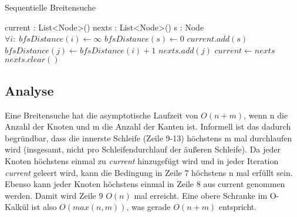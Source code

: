 \begin{algorithm}
	\caption{Sequentielle Breitensuche}
	\label{alg:sequential_bfs}
	\begin{algorithmic}[1]
		\State current : List<Node>()
		\State nexts : List<Node>()
		\State s : Node
		\State  $\forall i: \; bfsDistance(i) \gets \infty$
		\State $bfsDistance(s) \gets 0$
		\State $current.add(s)$
						\State $bfsDistance(j) \gets bfsDistance(i) + 1$
						\State $nexts.add(j)$
					\EndIf
				\EndFor
			\EndFor
			\State $current \gets nexts$
			\State $nexts.clear()$
		\EndWhile
	\end{algorithmic}
\end{algorithm}


\subsection{Analyse} %
\label{sub:analyse}
Eine Breitensuche hat die asymptotische Laufzeit von $O(n + m)$, wenn n die Anzahl der Knoten und m die Anzahl der Kanten ist. Informell ist das dadurch begründbar, dass die innerste Schleife (Zeile 9-13) höchstens m mal durchlaufen wird (insgesamt, nicht pro Schleifendurchlauf der äußeren Schleife). Da jeder Knoten höchstens einmal zu \textit{current} hinzugefügt wird und in jeder Iteration \textit{current} geleert wird, kann die Bedingung in Zeile 7 höchstens n mal erfüllt sein. Ebenso kann jeder Knoten höchstens einmal in Zeile 8 aus current genommen werden. Damit wird Zeile 9 $O(n)$ mal erreicht. Eine obere Schranke im O-Kalkül ist also $O(max(n,m))$, was gerade $O(n + m)$ entspricht.


